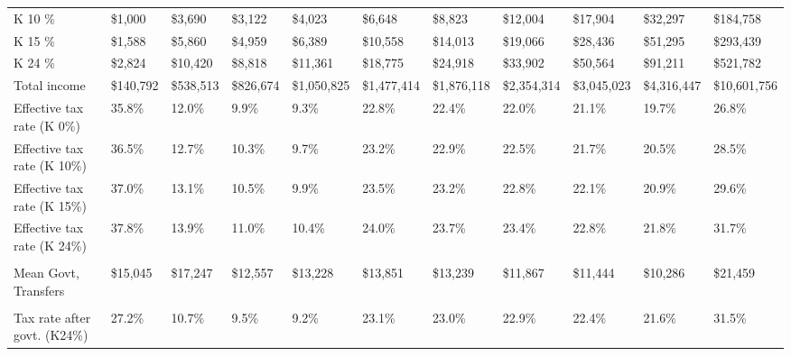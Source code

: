 \documentclass[12pt]{article}
\begin{document}
\begin{landscape}
\begin{table}[]
\begin{tabular}{lllllllllll}
K 10 \%           & \$1,000   & \$3,690   & \$3,122   & \$4,023     & \$6,648     & \$8,823     & \$12,004    & \$17,904    & \$32,297    & \$184,758    \\
K 15 \%           & \$1,588   & \$5,860   & \$4,959   & \$6,389     & \$10,558    & \$14,013    & \$19,066    & \$28,436    & \$51,295    & \$293,439    \\
K 24 \%          & \$2,824   & \$10,420  & \$8,818   & \$11,361    & \$18,775    & \$24,918    & \$33,902    & \$50,564    & \$91,211    & \$521,782    \\
Total income                                          & \$140,792 & \$538,513 & \$826,674 & \$1,050,825 & \$1,477,414 & \$1,876,118 & \$2,354,314 & \$3,045,023 & \$4,316,447 & \$10,601,756 \\
Effective tax rate (K 0\%)                            & 35.8\%    & 12.0\%    & 9.9\%     & 9.3\%       & 22.8\%      & 22.4\%      & 22.0\%      & 21.1\%      & 19.7\%      & 26.8\%       \\
Effective tax rate (K 10\%)                           & 36.5\%    & 12.7\%    & 10.3\%    & 9.7\%       & 23.2\%      & 22.9\%      & 22.5\%      & 21.7\%      & 20.5\%      & 28.5\%       \\
Effective tax rate (K 15\%)                           & 37.0\%    & 13.1\%    & 10.5\%    & 9.9\%       & 23.5\%      & 23.2\%      & 22.8\%      & 22.1\%      & 20.9\%      & 29.6\%       \\
Effective tax rate (K 24\%)                           & 37.8\%    & 13.9\%    & 11.0\%    & 10.4\%      & 24.0\%      & 23.7\%      & 23.4\%      & 22.8\%      & 21.8\%      & 31.7\%       \\
                                                      &           &           &           &             &             &             &             &             &             &              \\
Mean Govt, Transfers                 & \$15,045  & \$17,247  & \$12,557  & \$13,228    & \$13,851    & \$13,239    & \$11,867    & \$11,444    & \$10,286    & \$21,459     \\
                                                      &           &           &           &             &             &             &             &             &             &              \\
Tax rate after govt. (K24\%) & 27.2\%    & 10.7\%    & 9.5\%     & 9.2\%       & 23.1\%      & 23.0\%      & 22.9\%      & 22.4\%      & 21.6\%      & 31.5\%      \\ \hline
\end{tabular}
\end{table}
\end{landscape}
\end{document}
